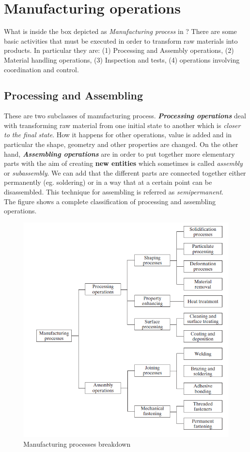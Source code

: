 \section{Manufacturing operations}
What is inside the box depicted as \textit{Manufacturing process} in ? There are some basic activities that must be executed in order to transform raw materials into products. In particular they are: (1) Processing and Assembly operations, (2) Material handling operations, (3) Inspection and tests, (4) operations involving coordination and control.

\subsection{Processing and Assembling}
These are two subclasses of manufacturing process. \textbf{\textit{Processing operations}} deal with transforming raw material from one initial state to another which is \textit{closer to the final state}. How it happens for other operations, value is added and in particular the shape, geometry and other properties are changed. On the other hand, \textbf{\textit{Assembling operations}} are in order to put together more elementary parts with the aim of creating \textbf{new entities} which sometimes is called \textit{assembly} or \textit{subassembly}. We can add that the different parts are connected together either permanently (eg. soldering) or in a way that at a certain point can be disassembled. This technique for assembling is referred as \textit{semipermanent}.\\
The figure  shows a complete classification of processing and assembling operations.

\begin{figure}
    \centering
    \includegraphics[scale=1]{img/man_processes.png}
    \caption{Manufacturing processes breakdown}
    \label{fig:man_breakdown}
\end{figure}

